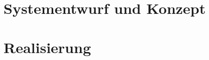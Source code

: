 

\section{Systementwurf und Konzept} \label{systementwurf-2}



\newpage
\section{Realisierung} \label{realisierung-2}



\iffalse %
\newpage
\section{Emotionsinduktion} \label{emotionsinduktion-2}



\newpage
\section{Messreihe} \label{messreihe-2}



\newpage
\section{Mustererkennung} \label{mustererkennung-2}


\newpage
\section{Ergebnisse} \label{ergenisse-2}

\fi